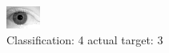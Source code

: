 \begin{figure}[h!]
\begin{center}
\includegraphics[width=0.60\columnwidth]{figures/ID2195_class_4_target_3.png}
\end{center}
\caption{ Classification: 4 actual target: 3}
\label{fig:ID2195_class_4_target_3}
\end{figure}
